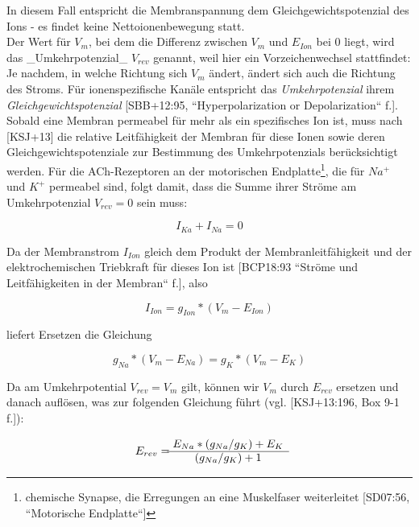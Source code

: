 {{In diesem Fall entspricht die Membranspannung dem Gleichgewichtspotenzial des Ions - es findet keine Nettoionenbewegung statt.\\

Der Wert für $V_m$, bei dem die Differenz zwischen $V_m$ und $E_{Ion}$ bei $0$ liegt, wird das _Umkehrpotenzial_ $V_{rev}$ genannt, weil hier ein Vorzeichenwechsel stattfindet: Je nachdem, in welche Richtung sich $V_m$ ändert, ändert sich auch die Richtung des Stroms. 
Für ionenspezifische Kanäle entspricht das \textit{Umkehrpotenzial} ihrem \textit{Gleichgewichtspotenzial} [SBB+12:95, ``Hyperpolarization or Depolarization`` f.].\\

Sobald eine Membran permeabel für mehr als ein spezifisches Ion ist, muss nach [KSJ+13] die relative Leitfähigkeit der Membran für diese Ionen sowie deren Gleichgewichtspotenziale zur Bestimmung des Umkehrpotenzials berücksichtigt werden. 
Für die ACh-Rezeptoren an der motorischen Endplatte\footnote{
 chemische Synapse, die Erregungen an eine Muskelfaser weiterleitet [SD07:56, ``Motorische Endplatte``]
}, die für $Na^+$ und $K^+$ permeabel sind, folgt damit, dass die Summe ihrer Ströme am Umkehrpotenzial $V_{rev} = 0$ sein muss:

\begin{equation}
I_{Ka} + I_{Na} = 0
\end{equation}

Da der Membranstrom $I_{Ion}$ gleich dem Produkt der Membranleitfähigkeit und der elektrochemischen Triebkraft für dieses Ion ist [BCP18:93 ``Ströme und Leitfähigkeiten in der Membran`` f.], also

\begin{equation}
I_{Ion} = g_{Ion} * (V_m - E_{Ion})
\end{equation}

liefert Ersetzen die Gleichung

\begin{equation}
g_{Na} * (V_m - E_{Na}) = g_{K} * (V_m - E_{K})
\end{equation}

Da am Umkehrpotential $V_{rev} = V_m$ gilt, können wir $V_m$ durch $E_{rev}$ ersetzen und danach auflösen, was zur folgenden Gleichung führt (vgl. [KSJ+13:196, Box 9-1 f.]):

\begin{equation}
E_{rev} = \begin{matrix}
            E_{Na} \space * \space (g_{Na} \space / \space g_{K}) \space + \space E_{K}  \\ \hline
            (g_{Na} \space / \space g_{K}) \space + 1
\end{matrix}
\end{equation}

}}

